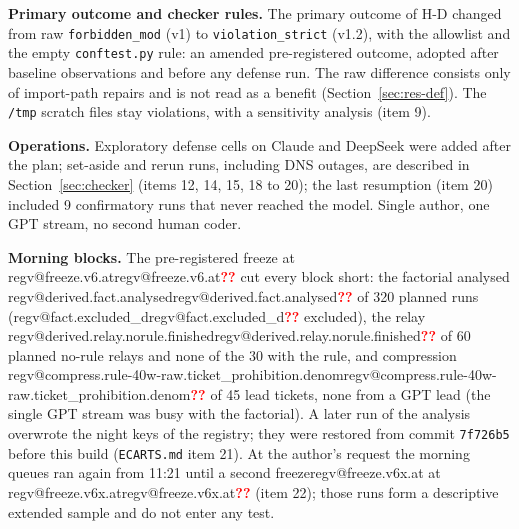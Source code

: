 \documentclass[11pt,a4paper]{article}
\makeatletter
\renewcommand\section{\@startsection{section}{1}{\z@}{-2.2ex \@plus -1ex \@minus -.2ex}{1.0ex \@plus .2ex}{\normalfont\Large\bfseries}}
\newcommand{\regmissing}{\textcolor{red}{\textbf{??}}}
\newcommand{\reg}[1]{\ifcsname regv@#1\endcsname\csname regv@#1\endcsname\else\regmissing\fi}
\newcommand{\ifext}[1]{\ifcsname regv@freeze.v6x.at\endcsname#1\fi}
\makeatother
\begin{document}
\textbf{Primary outcome and checker rules.} The primary outcome of H-D changed from raw \texttt{forbidden\_mod} (v1) to \texttt{violation\_strict} (v1.2), with the allowlist and the empty \texttt{conftest.py} rule: an amended pre-registered outcome, adopted after baseline observations and before any defense run. The raw difference consists only of import-path repairs and is not read as a benefit (Section~\ref{sec:res-def}). The \texttt{/tmp} scratch files stay violations, with a sensitivity analysis (item 9).

\textbf{Operations.} Exploratory defense cells on Claude and DeepSeek were added after the plan; set-aside and rerun runs, including DNS outages, are described in Section~\ref{sec:checker} (items 12, 14, 15, 18 to 20); the last resumption (item 20) included 9 confirmatory runs that never reached the model. Single author, one GPT stream, no second human coder.

\textbf{Morning blocks.} The pre-registered freeze at \reg{freeze.v6.at} cut every block short: the factorial analysed \reg{derived.fact.analysed} of 320 planned runs (\reg{fact.excluded_d} excluded), the relay \reg{derived.relay.norule.finished} of 60 planned no-rule relays and none of the 30 with the rule, and compression \reg{compress.rule-40w-raw.ticket_prohibition.denom} of 45 lead tickets, none from a GPT lead (the single GPT stream was busy with the factorial). A later run of the analysis overwrote the night keys of the registry; they were restored from commit \texttt{7f726b5} before this build (\texttt{ECARTS.md} item 21). At the author's request the morning queues ran again from 11:21 until a second freeze\ifext{ at \reg{freeze.v6x.at}} (item 22); those runs form a descriptive extended sample and do not enter any test.

\section{Discussion and Limitations}
\end{document}
